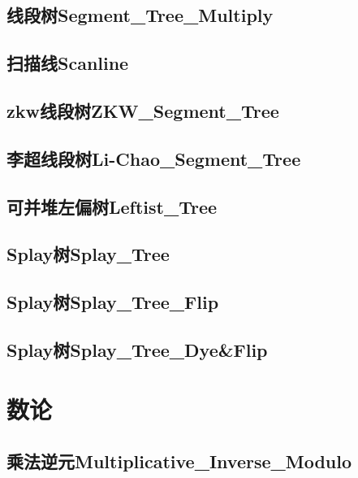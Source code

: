 \documentclass[10pt,a4paper]{article}
\begin{document}
\subsection{线段树Segment\_Tree\_Multiply}

\subsection{扫描线Scanline}

\subsection{zkw线段树ZKW\_Segment\_Tree}

\subsection{李超线段树Li-Chao\_Segment\_Tree}

\subsection{可并堆左偏树Leftist\_Tree}

\subsection{Splay树Splay\_Tree}

\subsection{Splay树Splay\_Tree\_Flip}

\subsection{Splay树Splay\_Tree\_Dye\&Flip}

% 

\newpage
\section{数论}
\subsection{乘法逆元Multiplicative\_Inverse\_Modulo}

\end{document}
